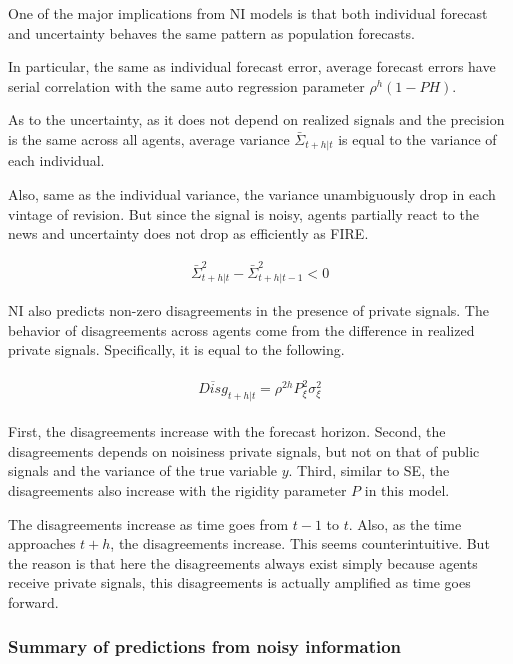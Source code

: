\documentclass[]{article}
\begin{document}
	One of the major implications from NI models is that both individual forecast and uncertainty behaves the same pattern as population forecasts. 
	
	In particular, the same as individual forecast error, average forecast errors have serial correlation with the same auto regression parameter $\rho^h(1-PH)$. 
	
	As to the uncertainty, as it does not depend on realized signals and the precision is the same across all agents, average variance $\bar \Sigma_{t+h|t}$ is equal to the variance of each individual. 
	
	Also, same as the individual variance, the variance unambiguously drop in each vintage of revision. But since the signal is noisy, agents partially react to the news and uncertainty does not drop as efficiently as FIRE. 
	
	\begin{eqnarray}
		\bar \Sigma^2_{t+h|t} -  \bar \Sigma^2_{t+h|t-1}< 0 
	\end{eqnarray}
	
	NI also predicts non-zero disagreements in the presence of private signals. The behavior of disagreements across agents come from the difference in realized private signals. Specifically, it is equal to the following. 
	
	\begin{eqnarray}
		\begin{aligned}
			\overline {Disg}_{t+h|t} = \rho^{2h} P^2_\xi \sigma^2_\xi  
		\end{aligned}
	\end{eqnarray}
	
	First, the disagreements increase with the forecast horizon.  Second, the disagreements depends on noisiness private signals, but not on that of public signals and the variance of the true variable $y$. Third, similar to SE, the disagreements also increase with the rigidity parameter $P$ in this model.
	
	The disagreements increase as time goes from $t-1$ to $t$. Also, as the time approaches $t+h$, the disagreements increase. This seems counterintuitive. But the reason is that here the disagreements always exist simply because agents receive private signals, this disagreements is actually amplified as time goes forward. 
	
	
	\subsubsection{Summary of predictions from noisy information}
	
\end{document}

